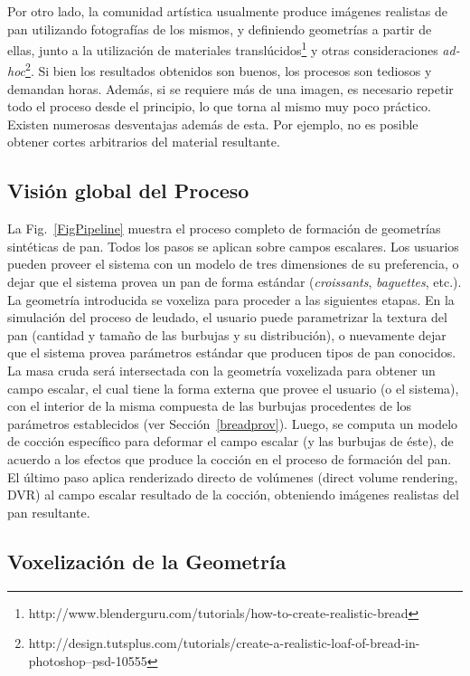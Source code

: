 Por otro lado, la comunidad artística usualmente produce imágenes realistas de pan utilizando fotografías de los mismos, y definiendo geometrías a partir de ellas, junto a la utilización de materiales translúcidos\footnote{http://www.blenderguru.com/tutorials/how-to-create-realistic-bread} y otras consideraciones {\em ad-hoc}\footnote{http://design.tutsplus.com/tutorials/create-a-realistic-loaf-of-bread-in-photoshop--psd-10555}.
Si bien los resultados obtenidos son buenos, los procesos son tediosos y demandan horas.
Además, si se requiere más de una imagen, es necesario repetir todo el proceso desde el principio, lo que torna al mismo muy poco práctico.
Existen numerosas desventajas además de esta.
Por ejemplo, no es posible obtener cortes arbitrarios del material resultante.


\subsection{Visión global del Proceso}
La Fig.~\ref{FigPipeline} muestra el proceso completo de formación de geometrías sintéticas de pan.
Todos los pasos se aplican sobre campos escalares.
Los usuarios pueden proveer el sistema con un modelo de tres dimensiones de su preferencia, o dejar que el sistema provea un pan de forma estándar ({\em croissants}, {\em baguettes}, etc.).
La geometría introducida se voxeliza para proceder a las siguientes etapas.
En la simulación del proceso de leudado, el usuario puede parametrizar la textura del pan (cantidad y tamaño de las burbujas y su distribución), o nuevamente dejar que el sistema provea parámetros estándar que producen tipos de pan conocidos.
La masa cruda será intersectada con la geometría voxelizada para obtener un campo escalar, el cual tiene la forma externa que provee el usuario (o el sistema), con el interior de la misma compuesta de las burbujas procedentes de los parámetros establecidos (ver Sección~\ref{breadprov}).
Luego, se computa un modelo de cocción específico \cite{Powathil2004} para deformar el campo escalar (y las burbujas de éste), de acuerdo a los efectos que produce la cocción en el proceso de formación del pan.
El último paso aplica renderizado directo de volúmenes (direct volume rendering, DVR) \cite{Kruger2003} al campo escalar resultado de la cocción, obteniendo imágenes realistas del pan resultante.


\subsection{Voxelización de la Geometría}

